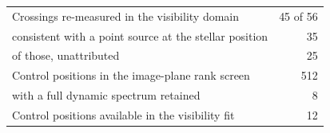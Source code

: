 \begin{tabular}{@{}lr@{}}
\hline
Crossings re-measured in the visibility domain & 45 of 56 \\
\quad consistent with a point source at the stellar position & 35 \\
\quad of those, unattributed & 25 \\
\hline
Control positions in the image-plane rank screen & 512 \\
\quad with a full dynamic spectrum retained & 8 \\
Control positions available in the visibility fit & 12 \\
\hline
\end{tabular}
